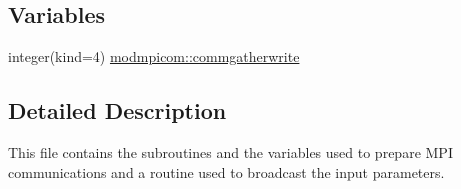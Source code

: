 \subsection*{Variables}
\begin{DoxyCompactItemize}
\item 
integer(kind=4) \hyperlink{namespacemodmpicom_a81805e955c1ef5ffb5846c0dad06976f}{modmpicom\+::commgatherwrite}
\end{DoxyCompactItemize}


\subsection{Detailed Description}
This file contains the subroutines and the variables used to prepare M\+PI communications and a routine used to broadcast the input parameters. 


